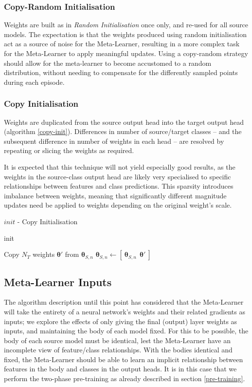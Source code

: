 \documentclass{report}
\begin{document}
\subsubsection{Copy-Random Initialisation}
Weights are built as in \textit{Random Initialisation} once only, and re-used for all source models. The expectation is that the weights produced using random initialisation act as a source of noise for the Meta-Learner, resulting in a more complex task for the Meta-Learner to apply meaningful updates. Using a copy-random strategy should allow for the meta-learner to become accustomed to a random distribution, without needing to compensate for the differently sampled points during each episode.

\subsubsection{Copy Initialisation}
Weights are duplicated from the source output head into the target output head (algorithm \ref{copy-init}). Differences in number of source/target classes -- and the subsequent difference in number of weights in each head -- are resolved by repeating or slicing the weights as required. \par
It is expected that this technique will not yield especially good results, as the weights in the source-class output head are likely very specialised to specific relationships between features and class predictions. This sparsity introduces imbalance between weights, meaning that significantly different magnitude updates need be applied to weights depending on the original weight's scale.
\begin{algorithm}[h!]
	\caption{$init$ - Copy Initialisation }init
	\label{copy-init}
	\begin{algorithmic}[1]
		\State Copy $N_T$ weights $\bm{\theta}'$ from $\bm{\theta}_{S,n}$
		\State $\bm{\theta}_{S,n} \gets [~ \bm{\theta}_{S,n}~ ~ \bm{\theta}'~ ]$
	\end{algorithmic}
\end{algorithm}

\subsection{Meta-Learner Inputs} \label{ml-inputs}
The algorithm description until this point has considered that the Meta-Learner will take the entirety of a neural network's weights and their related gradients as inputs; we explore the effects of only giving the final (output) layer weights as inputs, and maintaining the body of each model fixed. For this to be possible, the body of each source model must be identical, lest the Meta-Learner have an incomplete view of feature/class relationships. With the bodies identical and fixed, the Meta-Learner should be able to learn an implicit relationship between features in the body and classes in the output heads. It is in this case that we perform the two-phase pre-training as already described in section \ref{pre-training}.
\end{document}
